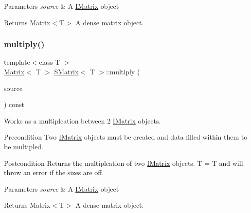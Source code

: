 \begin{DoxyParams}{Parameters}
{\em source} & A \mbox{\hyperlink{class_i_matrix}{I\+Matrix}} object \\
\hline
\end{DoxyParams}
\begin{DoxyReturn}{Returns}
Matrix$<$\+T$>$ A dense matrix object. 
\end{DoxyReturn}
\mbox{\label{class_s_matrix_aba9d4c54e9e989a8e6e59460bec2a235}} 
\subsubsection{\texorpdfstring{multiply()}{multiply()}\hspace{0.1cm}{\footnotesize\ttfamily [3/6]}}
{\footnotesize\ttfamily template$<$class T $>$ \\
\mbox{\hyperlink{class_matrix}{Matrix}}$<$ T $>$ \mbox{\hyperlink{class_s_matrix}{S\+Matrix}}$<$ T $>$\+::multiply (\begin{DoxyParamCaption}\item[{const \mbox{\hyperlink{class_i_matrix}{I\+Matrix}}$<$ \mbox{\hyperlink{class_l_matrix}{L\+Matrix}}$<$ T $>$, T $>$ \&}]{source }\end{DoxyParamCaption}) const}



Works as a multiplcation between 2 \mbox{\hyperlink{class_i_matrix}{I\+Matrix}} objects. 

\begin{DoxyPrecond}{Precondition}
Two \mbox{\hyperlink{class_i_matrix}{I\+Matrix}} objects must be created and data filled within them to be multipled. 
\end{DoxyPrecond}
\begin{DoxyPostcond}{Postcondition}
Returns the multiplcation of two \mbox{\hyperlink{class_i_matrix}{I\+Matrix}} objects. T = T and will throw an error if the sizes are off.
\end{DoxyPostcond}

\begin{DoxyParams}{Parameters}
{\em source} & A \mbox{\hyperlink{class_i_matrix}{I\+Matrix}} object \\
\hline
\end{DoxyParams}
\begin{DoxyReturn}{Returns}
Matrix$<$\+T$>$ A dense matrix object. 
\end{DoxyReturn}
\mbox{\label{class_s_matrix_a66f229dfaa83ff1a5c9115e8dcfa1d9e}} 
